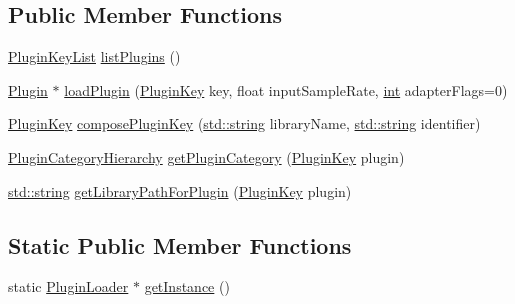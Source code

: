 \subsection*{Public Member Functions}
\begin{DoxyCompactItemize}
\item 
\hyperlink{class_vamp_1_1_host_ext_1_1_plugin_loader_a0d48b76e4f995110f53e0feeb23f733a}{Plugin\+Key\+List} \hyperlink{class_vamp_1_1_host_ext_1_1_plugin_loader_aec450c2928b1ae5318d45972722dd16b}{list\+Plugins} ()
\item 
\hyperlink{class_vamp_1_1_plugin}{Plugin} $\ast$ \hyperlink{class_vamp_1_1_host_ext_1_1_plugin_loader_a2154970381343edef629482bdafea7e2}{load\+Plugin} (\hyperlink{class_vamp_1_1_host_ext_1_1_plugin_loader_a473645bbb3ac5c1a0da2f0f482947c4d}{Plugin\+Key} key, float input\+Sample\+Rate, \hyperlink{xmltok_8h_a5a0d4a5641ce434f1d23533f2b2e6653}{int} adapter\+Flags=0)
\item 
\hyperlink{class_vamp_1_1_host_ext_1_1_plugin_loader_a473645bbb3ac5c1a0da2f0f482947c4d}{Plugin\+Key} \hyperlink{class_vamp_1_1_host_ext_1_1_plugin_loader_abe147b1da483df1afef5c0655aaf3f8d}{compose\+Plugin\+Key} (\hyperlink{test__lib_f_l_a_c_2format_8c_ab02026ad0de9fb6c1b4233deb0a00c75}{std\+::string} library\+Name, \hyperlink{test__lib_f_l_a_c_2format_8c_ab02026ad0de9fb6c1b4233deb0a00c75}{std\+::string} identifier)
\item 
\hyperlink{class_vamp_1_1_host_ext_1_1_plugin_loader_ad6a39aa0c79d8d9209eb0b8dfe9d1364}{Plugin\+Category\+Hierarchy} \hyperlink{class_vamp_1_1_host_ext_1_1_plugin_loader_ad5c594142ff058bd70e66247d45cd86e}{get\+Plugin\+Category} (\hyperlink{class_vamp_1_1_host_ext_1_1_plugin_loader_a473645bbb3ac5c1a0da2f0f482947c4d}{Plugin\+Key} plugin)
\item 
\hyperlink{test__lib_f_l_a_c_2format_8c_ab02026ad0de9fb6c1b4233deb0a00c75}{std\+::string} \hyperlink{class_vamp_1_1_host_ext_1_1_plugin_loader_a592d6b4c6edaa369407e833f56e4a4de}{get\+Library\+Path\+For\+Plugin} (\hyperlink{class_vamp_1_1_host_ext_1_1_plugin_loader_a473645bbb3ac5c1a0da2f0f482947c4d}{Plugin\+Key} plugin)
\end{DoxyCompactItemize}
\subsection*{Static Public Member Functions}
\begin{DoxyCompactItemize}
\item 
static \hyperlink{class_vamp_1_1_host_ext_1_1_plugin_loader}{Plugin\+Loader} $\ast$ \hyperlink{class_vamp_1_1_host_ext_1_1_plugin_loader_adbb5c8855697a24be890e4f107e26b0e}{get\+Instance} ()
\end{DoxyCompactItemize}
